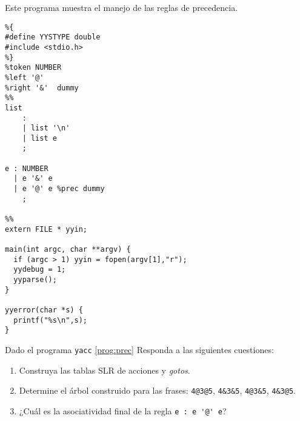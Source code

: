 \begin{program} Este programa muestra el manejo de las reglas de precedencia.
\label{prog:prec}
\begin{verbatim}
%{
#define YYSTYPE double
#include <stdio.h>
%}
%token NUMBER
%left '@' 
%right '&'  dummy
%%
list 
    :
    | list '\n'  
    | list e 
    ;

e : NUMBER  
  | e '&' e 
  | e '@' e %prec dummy
    ;

%%
extern FILE * yyin;
 
main(int argc, char **argv) {
  if (argc > 1) yyin = fopen(argv[1],"r");
  yydebug = 1;
  yyparse();
}
 
yyerror(char *s) {
  printf("%s\n",s);
}
\end{verbatim}            
\end{program}

\begin{exercise} Dado el programa \verb|yacc| \ref{prog:prec}
Responda a las siguientes cuestiones:
\begin{enumerate}
\item
Construya las tablas SLR de acciones y \emph{gotos}.
\item
Determine el árbol construido para las frases:
\verb|4@3@5|, \verb|4&3&5|, \verb|4@3&5|, \verb|4&3@5|.
\item
¿Cuál es la asociatividad final de la regla \verb|e : e '@' e|?
\end{enumerate}
\end{exercise}


